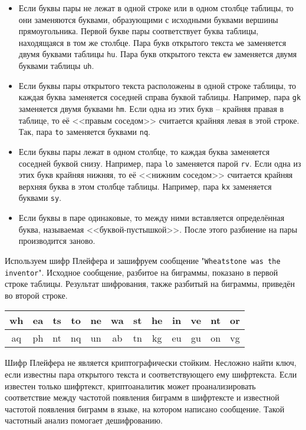 \begin{itemize}
    \item Если буквы пары не лежат в одной строке или в одном столбце таблицы, то они заменяются буквами, образующими с исходными буквами вершины прямоугольника. Первой букве пары соответствует буква таблицы, находящаяся в том же столбце. Пара букв открытого текста \texttt{we} заменяется двумя буквами таблицы \texttt{hu}. Пара букв открытого текста \texttt{ew} заменяется двумя буквами таблицы \texttt{uh}.
    \item Если буквы пары открытого текста расположены в одной строке таблицы, то каждая буква заменяется соседней справа буквой таблицы. Например, пара \texttt{gk} заменяется двумя буквами \texttt{hm}. Если одна из этих букв -- крайняя правая в таблице, то её <<правым соседом>> считается крайняя левая в этой строке. Так, пара \texttt{to} заменяется буквами \texttt{nq}.
    \item Если буквы пары лежат в одном столбце, то каждая буква заменяется соседней буквой снизу. Например, пара \texttt{lo} заменяется парой \texttt{rv}. Если одна из этих букв крайняя нижняя, то её <<нижним соседом>> считается крайняя верхняя буква в этом столбце таблицы. Например, пара \texttt{kx} заменяется буквами \texttt{sy}.
    \item Если буквы в паре одинаковые, то между ними вставляется определённая буква, называемая <<буквой-пустышкой>>. После этого разбиение на пары производится заново.
\end{itemize}

\example
Используем шифр Плейфера и зашифруем сообщение "\texttt{Wheatstone was the inventor}". Исходное сообщение, разбитое на биграммы, показано в первой строке таблицы. Результат шифрования, также разбитый на биграммы, приведён во второй строке.
\begin{center} \begin{tabular}{|*{12}c|}
    \hline
    wh & ea & ts & to & ne & wa & st & he & in & ve & nt & or \\
    \hline
    aq & ph & nt & nq & un & ab & tn & kg & eu & gu & on & vg \\
    \hline
\end{tabular} \end{center}
\exampleend

Шифр Плейфера не является криптографически стойким. Несложно найти ключ, если известны пара открытого текста и соответствующего ему шифртекста. Если известен только шифртекст, криптоаналитик может проанализировать соответствие между частотой появления биграмм в шифртексте и известной частотой появления биграмм в языке, на котором написано сообщение. Такой частотный анализ помогает дешифрованию.
